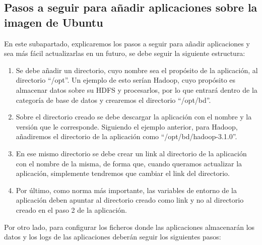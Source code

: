 \subsection{Pasos a seguir para añadir aplicaciones sobre la imagen de Ubuntu\label{pasosUbuntu}}

En este subapartado, explicaremos los pasos a seguir para añadir aplicaciones y sea más fácil actualizarlas en un futuro, se debe seguir la siguiente estructura:

\begin{enumerate}

\item Se debe añadir un directorio, cuyo nombre sea el propósito de la aplicación, al directorio “/opt”. Un ejemplo de esto serían Hadoop, cuyo propósito es almacenar datos sobre su HDFS y procesarlos, por lo que entrará dentro de la categoría de base de datos y crearemos el directorio “/opt/bd”.

\item Sobre el directorio creado se debe descargar la aplicación con el nombre y la versión que le corresponde. Siguiendo el ejemplo anterior, para Hadoop, añadiremos el directorio de la aplicación como “/opt/bd/hadoop-3.1.0”.

\item En ese mismo directorio se debe crear un link al directorio de la aplicación con el nombre de la misma, de forma que, cuando queramos actualizar la aplicación, simplemente tendremos que cambiar el link del directorio.

\item Por último, como norma más importante, las variables de entorno de la aplicación deben apuntar al directorio creado como link y no al directorio creado en el paso 2 de la aplicación.

\end{enumerate}


Por otro lado, para configurar los ficheros donde las aplicaciones almacenarán los datos y los logs de las aplicaciones deberán seguir los siguientes pasos:


